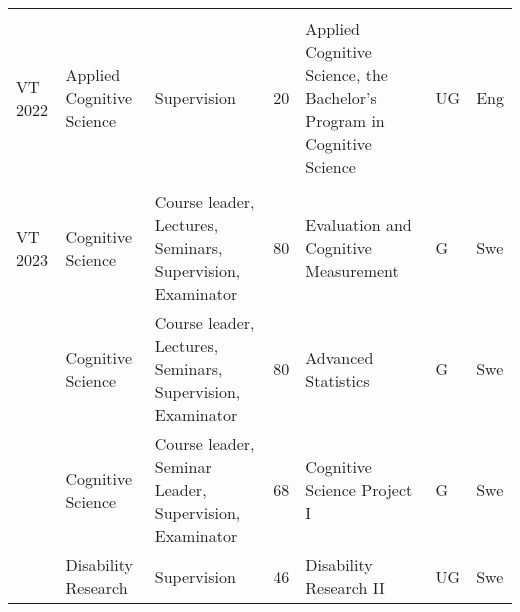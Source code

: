 \documentclass[]{article}
\begin{document}
\begin{landscape}
\begin{ThreePartTable}
\begin{longtable}[t]{l>{\raggedright\arraybackslash}p{5cm}>{\raggedright\arraybackslash}p{5cm}l>{\raggedright\arraybackslash}p{5cm}ll}
\addlinespace
 &  &  &  &  &  \vphantom{1} & \\
VT 2022 & Applied Cognitive Science & Supervision & 20 & Applied Cognitive Science, the Bachelor's Program in Cognitive Science & UG & Eng\\
 &  &  &  &  &  & \\
VT 2023 & Cognitive Science & Course leader, Lectures, Seminars, Supervision, Examinator & 80 & Evaluation and Cognitive Measurement & G & Swe\\
 & Cognitive Science & Course leader, Lectures, Seminars, Supervision, Examinator & 80 & Advanced Statistics & G & Swe\\
\addlinespace
 & Cognitive Science & Course leader, Seminar Leader, Supervision, Examinator & 68 & Cognitive Science Project I & G & Swe\\
 & Disability Research & Supervision & 46 & Disability Research II & UG & Swe\\*
\end{longtable}
\end{ThreePartTable}
\end{landscape}
\end{document}
